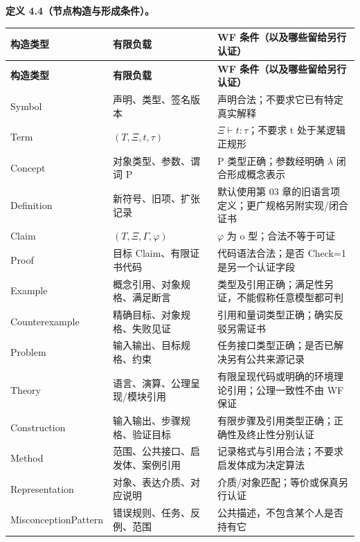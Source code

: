 \documentclass[UTF8,a4paper,zihao=-4,fontset=windows,openany]{ctexbook}
\newcommand{\mcsbrk}{\penalty 200\relax}
\begin{document}
\textbf{定义 4.4（节点构造与形成条件）。}

\begingroup\small\setlength{\tabcolsep}{4pt}
\begin{longtable}{>{\raggedright\arraybackslash}p{}>{\raggedright\arraybackslash}p{}>{\raggedright\arraybackslash}p{}}
\toprule
\textbf{构造类型} & \textbf{有限负载} & \textbf{WF 条件（以及哪些留给另行认证）} \\
\midrule
\endfirsthead
\toprule
\textbf{构造类型} & \textbf{有限负载} & \textbf{WF 条件（以及哪些留给另行认证）} \\
\midrule
\endhead
\bottomrule
\endfoot
\bottomrule
\endlastfoot
Symbol & 声明、类型、签名版本 & 声明合法；不要求它已有特定真实解释 \\
Term & \((T,\Xi,t,\tau)\) & \(\Xi\vdash t:\tau\)；不要求 t 处于某逻辑正规形 \\
Concept & 对象类型、参数、谓词 P & P 类型正确；参数经明确 \(\lambda\) 闭合形成概念表示 \\
Definition & 新符号、旧项、扩张记录 & 默认使用第 03 章的旧语言项定义；更广规格另附实现/闭合证书 \\
Claim & \((T,\Xi,\Gamma,\varphi)\) & \(\varphi\) 为 o 型；合法不等于可证 \\
Proof & 目标 Claim、有限证书代码 & 代码语法合法；是否 Check=1 是另一个认证字段 \\
Example & 概念引用、对象规格、满足断言 & 类型及引用正确；满足性另证，不能假称任意模型都可判 \\
Counterexample & 精确目标、对象规格、失败见证 & 引用和量词类型正确；确实反驳另需证书 \\
Problem & 输入输出、目标规格、约束 & 任务接口类型正确；是否已解决另有公共来源记录 \\
Theory & 语言、演算、公理呈现/模块引用 & 有限呈现代码或明确的环境理论引用；公理一致性不由 WF 保证 \\
Construction & 输入输出、步骤规格、验证目标 & 有限步骤及引用类型正确；正确性及终止性分别认证 \\
Method & 范围、公共接口、启发体、案例引用 & 记录格式与引用合法；不要求启发体成为决定算法 \\
Representation & 对象、表达介质、对应说明 & 介质/对象匹配；等价或保真另行认证 \\
Miscon\mcsbrk{}ceptio\mcsbrk{}nPatte\mcsbrk{}rn & 错误规则、任务、反例、范围 & 公共描述，不包含某个人是否持有它 \\
\end{longtable}
\endgroup
\end{document}
